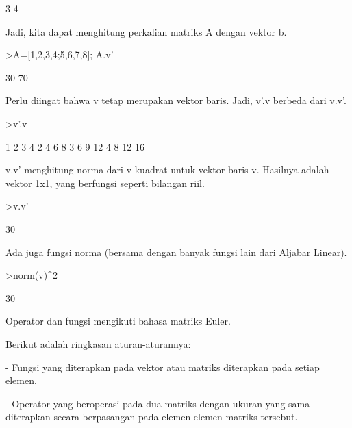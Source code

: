 \documentclass[a4paper,10pt]{article}
\begin{document}
\begin{eulernotebook}
\begin{eulercomment}
\begin{eulercomment}
\begin{eulercomment}
\begin{eulercomment}
\begin{eulercomment}
\begin{eulercomment}
\begin{euleroutput}
              3 
              4 
\end{euleroutput}
\begin{eulercomment}
Jadi, kita dapat menghitung perkalian matriks A dengan vektor b.
\end{eulercomment}
\begin{eulerprompt}
>A=[1,2,3,4;5,6,7,8]; A.v'
\end{eulerprompt}
\begin{euleroutput}
             30 
             70 
\end{euleroutput}
\begin{eulercomment}
Perlu diingat bahwa v tetap merupakan vektor baris. Jadi, v'.v berbeda
dari v.v'.
\end{eulercomment}
\begin{eulerprompt}
>v'.v
\end{eulerprompt}
\begin{euleroutput}
              1             2             3             4 
              2             4             6             8 
              3             6             9            12 
              4             8            12            16 
\end{euleroutput}
\begin{eulercomment}
v.v' menghitung norma dari v kuadrat untuk vektor baris v. Hasilnya
adalah vektor 1x1, yang berfungsi seperti bilangan riil.
\end{eulercomment}
\begin{eulerprompt}
>v.v'
\end{eulerprompt}
\begin{euleroutput}
  30
\end{euleroutput}
\begin{eulercomment}
Ada juga fungsi norma (bersama dengan banyak fungsi lain dari Aljabar
Linear).
\end{eulercomment}
\begin{eulerprompt}
>norm(v)^2
\end{eulerprompt}
\begin{euleroutput}
  30
\end{euleroutput}
\begin{eulercomment}
Operator dan fungsi mengikuti bahasa matriks Euler.

Berikut adalah ringkasan aturan-aturannya:

- Fungsi yang diterapkan pada vektor atau matriks diterapkan pada
setiap elemen.

- Operator yang beroperasi pada dua matriks dengan ukuran yang sama
diterapkan secara berpasangan pada elemen-elemen matriks tersebut.


\end{eulercomment}
\end{eulercomment}
\end{eulercomment}
\end{eulercomment}
\end{eulercomment}
\end{eulercomment}
\end{eulercomment}
\end{eulernotebook}
\end{document}
